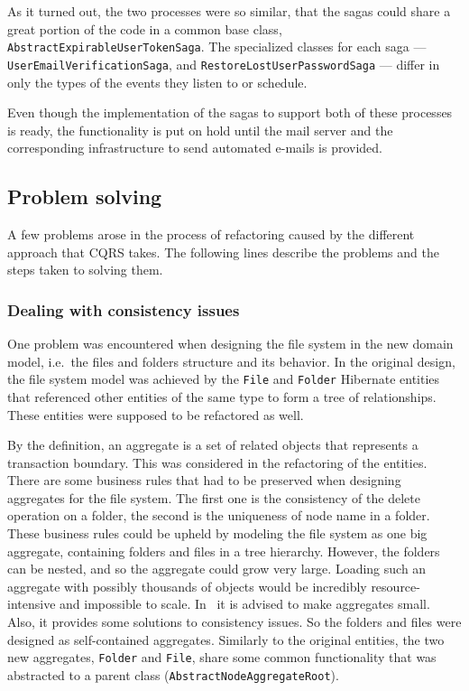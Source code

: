 \documentclass{book}
\begin{document}
As it turned out, the two processes were so similar, that the sagas
could share a great portion of the code in a common base class,
\texttt{AbstractExpirableUserTokenSaga}. The specialized classes for
each saga --- \texttt{UserEmailVerificationSaga}, and
\texttt{RestoreLostUserPasswordSaga} --- differ in only the types of the
events they listen to or schedule.

Even though the implementation of the sagas to support both of these
processes is ready, the functionality is put on hold until the mail
server and the corresponding infrastructure to send automated e-mails is
provided.


\subsection{Problem solving}\label{problem-solving}

A few problems arose in the process of refactoring caused by the
different approach that CQRS takes. The following lines describe the
problems and the steps taken to solving them.

\subsubsection{Dealing with consistency
issues}\label{dealing-with-consistency-issues}

One problem was encountered when designing the file system in the new
domain model, i.e.~the files and folders structure and its behavior. In
the original design, the file system model was achieved by the
\texttt{File} and \texttt{Folder} Hibernate entities that referenced
other entities of the same type to form a tree of relationships. These
entities were supposed to be refactored as well.

By the definition, an aggregate is a set of related objects that
represents a transaction boundary. This was considered in the
refactoring of the entities. There are some business rules that had to
be preserved when designing aggregates for the file system. The first
one is the consistency of the delete operation on a folder, the second
is the uniqueness of node name in a folder. These business rules could
be upheld by modeling the file system as one big aggregate, containing
folders and files in a tree hierarchy. However, the folders can be
nested, and so the aggregate could grow very large. Loading such an
aggregate with possibly thousands of objects would be incredibly
resource-intensive and impossible to scale. In~\cite{aggregate1}\cite{aggregate2}\cite{aggregate3} it is advised to
make aggregates small. Also, it provides some solutions to consistency
issues. So the folders and files were designed as self-contained
aggregates. Similarly to the original entities, the two new aggregates,
\texttt{Folder} and \texttt{File}, share some common functionality that
was abstracted to a parent class (\texttt{AbstractNodeAggregateRoot}).
\end{document}
